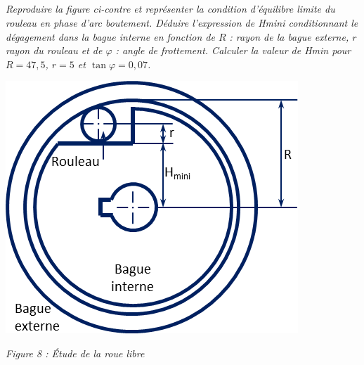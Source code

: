 \documentclass[10pt]{article}
\begin{document}


\begin{minipage}[c]{.6\linewidth}
\subparagraph{}
\textit{Reproduire la figure ci-contre et représenter la condition d'équilibre limite du rouleau en phase d'arc boutement. Déduire l'expression de Hmini conditionnant le dégagement dans la bague interne en fonction de $R$ : rayon de la bague externe, $r$ rayon du rouleau et de $\varphi$ : angle de frottement.
Calculer la valeur de Hmin pour $R=47,5$, $r=5$ et $\tan\varphi = 0,07$.}

\end{minipage} \hfill
\begin{minipage}[c]{.38\linewidth}
\begin{center}
\includegraphics[width=.95\textwidth]{images/rouelibre}

\textit{Figure 8 : Étude de la roue libre}
\end{center}
\end{minipage} 
\end{document}
